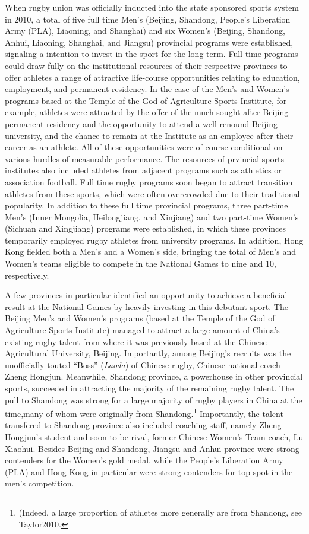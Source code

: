 {When rugby union was officially inducted into the state sponsored sports system in 2010, a total of five full time Men's (Beijing, Shandong, People's Liberation Army (PLA), Liaoning, and Shanghai) and six Women's (Beijing, Shandong, Anhui, Liaoning, Shanghai, and Jiangsu) provincial programs were established, signaling a intention to invest in the sport for the long term.  Full time programs could draw fully on the institutional resources of their respective provinces to offer athletes a range of attractive life-course opportunities relating to education, employment, and permanent residency.  In the case of the Men's and Women's programs based at the Temple of the God of Agriculture Sports Institute, for example, athletes were attracted by the offer of the much sought after Beijing permanent residency and the opportunity to attend a well-renound Beijing university, and the chance to remain at the Institute as an employee after their career as an athlete.  All of these opportunities were of course conditional on various hurdles of measurable performance.  The resources of prvincial sports institutes also included athletes from adjacent programs such as athletics or association football.  Full time rugby programs soon began to attract transition athletes from these sports, which were often overcrowded due to their traditional popularity.  In addition to these full time provincial programs, three part-time Men's (Inner Mongolia, Heilongjiang, and Xinjiang) and two part-time Women's (Sichuan and Xingjiang) programs were established, in which these provinces temporarily employed rugby athletes from university programs. In addition, Hong Kong fielded both a Men's and a Women's side, bringing the total of Men's and Women's teams eligible to compete in the National Games to nine and 10, respectively.

A few provinces in particular identified an opportunity to achieve a beneficial result at the National Games by heavily investing in this debutant sport.  The Beijing Men's and Women's programs (based at the Temple of the God of Agriculture Sports Institute) managed to attract a large amount of China's existing rugby talent from where it was previously based at the Chinese Agricultural University, Beijing.  Importantly, among Beijing's recruits was the unofficially touted ``Boss''  (\textit{Laoda}) of Chinese rugby, Chinese national coach Zheng Hongjun.  Meanwhile, Shandong province, a powerhouse in other provincial sports, succeeded in attracting the majority of the remaining rugby talent. The pull to Shandong was strong for a large majority of rugby players in China at the time,many of whom were originally from Shandong.\footnote{(Indeed, a large proportion of athletes more generally are from Shandong, see Taylor2010.}  Importantly, the talent transfered to Shandong province also included coaching staff, namely Zheng Hongjun's student and soon to be rival, former Chinese Women's Team coach, Lu Xiaohui.  Besides Beijing and Shandong, Jiangsu and Anhui province were strong contenders for the Women's gold medal, while the People's Liberation Army (PLA) and Hong Kong in particular were strong contenders for top spot in the men's competition.



}
